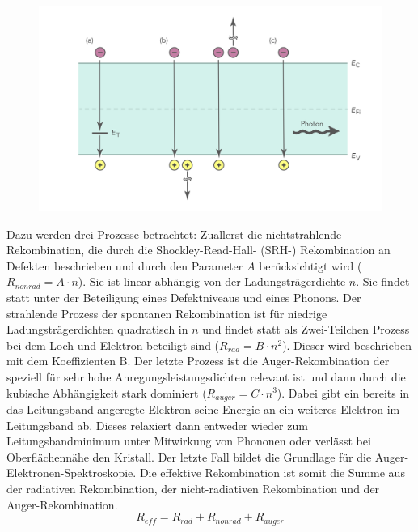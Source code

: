 %
\begin{figure}[h]
    \centering
    \begin{minipage}[t]{0.75\linewidth}
        \centering
        \includegraphics[width=\linewidth]{Bilder/rekbomChannels.png}
        \caption{}
        \label{fig:rekombChannels}
    \end{minipage}%
\end{figure}
\raggedright
%
Dazu werden drei Prozesse betrachtet: Zuallerst die nichtstrahlende Rekombination, die durch die Shockley-Read-Hall- (SRH-) Rekombination an Defekten beschrieben und durch den Parameter $A$ berücksichtigt wird ($R_{nonrad} = A \cdot n $). Sie ist linear abhängig von der Ladungsträgerdichte $n$. Sie findet statt unter der Beteiligung eines Defektniveaus und eines Phonons. Der strahlende Prozess der spontanen Rekombination ist für niedrige Ladungsträgerdichten quadratisch in $n$ und findet statt als Zwei-Teilchen Prozess bei dem Loch und Elektron beteiligt sind ($R_{rad} = B \cdot n^2 $). Dieser wird beschrieben mit dem Koeffizienten B. 
Der letzte Prozess ist die Auger-Rekombination der speziell für sehr hohe Anregungsleistungsdichten relevant ist und dann durch die kubische Abhängigkeit stark dominiert ($R_{auger} = C \cdot n^3 $). Dabei gibt ein bereits in das Leitungsband angeregte Elektron seine Energie an ein weiteres Elektron im Leitungsband ab. Dieses relaxiert dann entweder wieder zum Leitungsbandminimum unter Mitwirkung von Phononen oder verlässt bei Oberflächennähe den Kristall. Der letzte Fall bildet die Grundlage für die Auger-Elektronen-Spektroskopie.
Die effektive Rekombination ist somit die Summe aus der radiativen Rekombination, der nicht-radiativen Rekombination und der Auger-Rekombination.
\begin{equation}
    R_{eff} = R_{rad} + R_{nonrad} + R_{auger}
    \label{eq:iqe1}
\end{equation}
